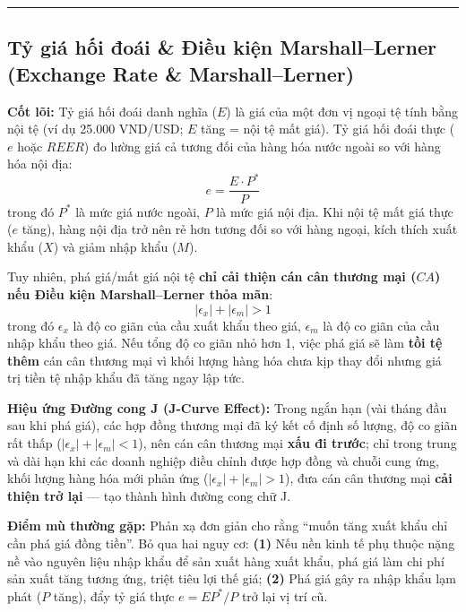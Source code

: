 \documentclass[
]{article}
\begin{document}
\begin{center}\rule{0.5\linewidth}{0.5pt}\end{center}

\subsection{Tỷ giá hối đoái \& Điều kiện Marshall--Lerner (Exchange Rate
\&
Marshall--Lerner)}\label{tux1ef7-giuxe1-hux1ed1i-ux111ouxe1i-ux111iux1ec1u-kiux1ec7n-marshalllerner-exchange-rate-marshalllerner}

\textbf{Cốt lõi:} Tỷ giá hối đoái danh nghĩa (\(E\)) là giá của một đơn
vị ngoại tệ tính bằng nội tệ (ví dụ 25.000 VND/USD; \(E\) tăng = nội tệ
mất giá). Tỷ giá hối đoái thực (\(e\) hoặc \(REER\)) đo lường giá cả
tương đối của hàng hóa nước ngoài so với hàng hóa nội địa:
\[ e = \frac{E \cdot P^*}{P} \] trong đó \(P^*\) là mức giá nước ngoài,
\(P\) là mức giá nội địa. Khi nội tệ mất giá thực (\(e\) tăng), hàng nội
địa trở nên rẻ hơn tương đối so với hàng ngoại, kích thích xuất khẩu
(\(X\)) và giảm nhập khẩu (\(M\)).

Tuy nhiên, phá giá/mất giá nội tệ \textbf{chỉ cải thiện cán cân thương
mại (\(CA\)) nếu Điều kiện Marshall--Lerner thỏa mãn}:
\[ |\epsilon_x| + |\epsilon_m| > 1 \] trong đó \(\epsilon_x\) là độ co
giãn của cầu xuất khẩu theo giá, \(\epsilon_m\) là độ co giãn của cầu
nhập khẩu theo giá. Nếu tổng độ co giãn nhỏ hơn 1, việc phá giá sẽ làm
\textbf{tồi tệ thêm} cán cân thương mại vì khối lượng hàng hóa chưa kịp
thay đổi nhưng giá trị tiền tệ nhập khẩu đã tăng ngay lập tức.

\textbf{Hiệu ứng Đường cong J (J-Curve Effect):} Trong ngắn hạn (vài
tháng đầu sau khi phá giá), các hợp đồng thương mại đã ký kết cố định số
lượng, độ co giãn rất thấp (\(|\epsilon_x| + |\epsilon_m| < 1\)), nên
cán cân thương mại \textbf{xấu đi trước}; chỉ trong trung và dài hạn khi
các doanh nghiệp điều chỉnh được hợp đồng và chuỗi cung ứng, khối lượng
hàng hóa mới phản ứng (\(|\epsilon_x| + |\epsilon_m| > 1\)), đưa cán cân
thương mại \textbf{cải thiện trở lại} --- tạo thành hình đường cong chữ
J.

\textbf{Điểm mù thường gặp:} Phản xạ đơn giản cho rằng ``muốn tăng xuất
khẩu chỉ cần phá giá đồng tiền''. Bỏ qua hai nguy cơ: \textbf{(1)} Nếu
nền kinh tế phụ thuộc nặng nề vào nguyên liệu nhập khẩu để sản xuất hàng
xuất khẩu, phá giá làm chi phí sản xuất tăng tương ứng, triệt tiêu lợi
thế giá; \textbf{(2)} Phá giá gây ra nhập khẩu lạm phát (\(P\) tăng),
đẩy tỷ giá thực \(e = E P^* / P\) trở lại vị trí cũ.
\end{document}
